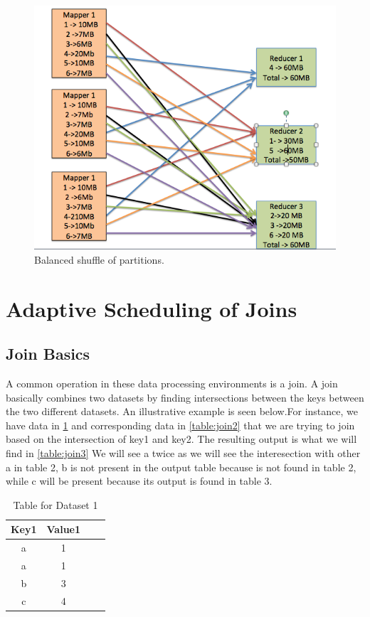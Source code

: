  \begin{figure}[h]
\begin{center}
\includegraphics[scale=1.0]{./img/shuffle_balanced.png}
\caption{Balanced shuffle of partitions.}
\label{fig:shuffle_balanced.png}
\end{center}
\end{figure}

\section{Adaptive Scheduling of Joins}\label{intro-ch:eeg-overview}

\subsection{Join Basics}

A common operation in these data processing environments is a join.
A join basically combines two datasets by finding intersections between
the keys between the two different datasets. An illustrative example
is seen below.For instance, we have data in  \ref{table:join1} and corresponding
data in \ref{table:join2} that we are trying to join based on the intersection
of key1 and key2. The resulting output is what we will find in \ref{table:join3}   
We will see a twice as we will see the interesection with other a in table 2,
b is not present in the output table because is not found in table 2, while 
c will be present because its output is found in table 3.

\begin{table}[h!]
\centering
 \begin{tabular}{|c |c |c |c|}
  \hline
   Key1 & Value1 \\
  \hline
   a & 1 \\
  \hline
   a & 1 \\
  \hline
   b & 3 \\
  \hline
   c & 4 \\
  \hline
\end{tabular}
\caption{Table for Dataset 1}
\label{table:join1}
\end{table}

